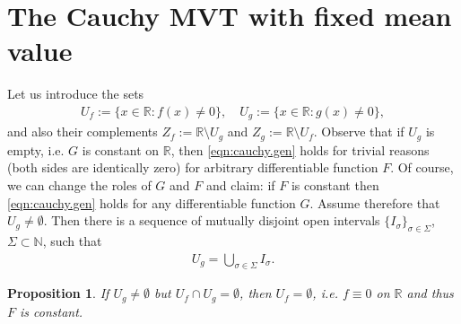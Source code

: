 \documentclass{birkjour}
\newtheorem{proposition}[theorem]{Proposition}
\begin{document}
\section{The Cauchy MVT with fixed mean value}

Let us introduce the sets
\begin{align}\label{U_f,U_g}
U_f := \{ x \in {{\mathbb R}}: f(x) \ne 0 \}, \quad U_g := \{ x \in {{\mathbb R}}: g(x) \ne 0 \},
\end{align}
and also their complements $Z_f := {{\mathbb R}} \setminus U_g$ and $Z_g := {{\mathbb R}} \setminus U_f$. Observe that if $U_g$ is empty, i.e. $G$ is constant on ${{\mathbb R}}$, then \eqref{eqn:cauchy.gen} holds for trivial reasons (both sides are identically zero) for arbitrary differentiable function $F$. Of course, we can change the roles of $G$ and $F$ and claim: if $F$ is constant then \eqref{eqn:cauchy.gen} holds for any differentiable function $G$. Assume therefore that $U_g\neq\emptyset$. Then there is a sequence of mutually disjoint open intervals $\{I_\sigma\}_{\sigma\in\Sigma}$, $\Sigma\subset\mathbb{N}$, such that
\begin{align}
\label{rep:U_g=sum.of.itvs}
\displaystyle U_g=\bigcup_{\sigma\in\Sigma}I_{\sigma}.
\end{align}
\begin{proposition}
\label{prop:cauchy.gen.U_g<>empty}
If $U_g\neq\emptyset$ but $U_f\cap U_g = \emptyset$, then $U_f=\emptyset$, i.e. $f\equiv 0$ on ${{\mathbb R}}$ and thus $F$ is constant.
\end{proposition}
\end{document}
